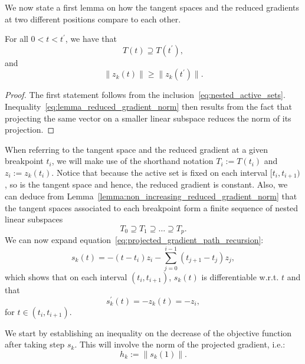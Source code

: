 We now state a first lemma on how the tangent spaces and the reduced gradients at two different positions compare to each other.
\begin{lemma}\label{lemma:non_increasing_reduced_gradient_norm}
	For all $0 < t < t^\prime$, we have that 
	\begin{equation*}
		T(t) \supseteq T(t^\prime),
	\end{equation*}
	and
	\begin{equation}\label{eq:lemma_reduced_gradient_norm}
		\|z_k(t)\| \ge \|z_k(t^\prime)\|.
	\end{equation}
\end{lemma}
\begin{proof}
	The first statement follows from the inclusion~\eqref{eq:nested_active_sets}. Inequality~\eqref{eq:lemma_reduced_gradient_norm} then results from the fact that projecting the same vector on a smaller linear subspace reduces the norm of its projection. 
\end{proof}
When referring to the tangent space and the reduced gradient at a given breakpoint $t_i$, we will make use of the shorthand notation $T_i := T(t_i)$ and $z_i:=z_k(t_i)$. Notice that because the active set is fixed on each interval $[t_i,t_{i+1})$, so is the tangent space and hence, the reduced gradient is constant. Also, we can deduce from Lemma~\ref{lemma:non_increasing_reduced_gradient_norm} that the tangent spaces associated to each breakpoint form a finite sequence of nested linear subspaces
\[T_0 \supseteq T_1 \supseteq \ldots \supseteq T_p.\]
We can now expand equation~\eqref{eq:projected_gradient_path_recursion}:
\begin{equation}\label{eq:projected_gradient_path_full_expr}
	s_k(t) = -(t-t_i)z_i - \sum_{j=0}^{i-1}(t_{j+1}-t_j)z_j,
\end{equation}
which shows that on each interval $(t_i,t_{i+1})$, $s_k(t)$ is differentiable w.r.t. $t$ and that
\begin{equation}\label{eq:projected_gradient_path_derivative}
	s_k^\prime(t) = -z_k(t) = -z_i,
\end{equation}
for $t \in (t_i,t_{i+1})$.

We start by establishing an inequality on the decrease of the objective function after taking step $s_k$. This will involve the norm of the projected gradient, i.e.:
\begin{equation}\label{eq:crit_norm_projected_grad}
	h_k := \left\|s_k(1)\right\|.
\end{equation}

